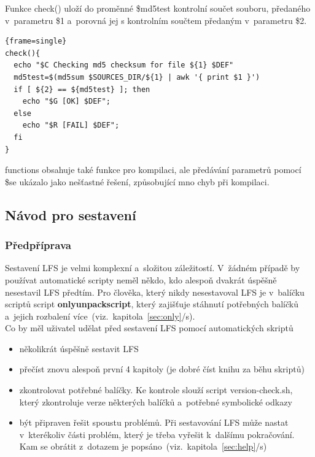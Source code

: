 \documentclass[a4paper,12pt]{article}
\newcommand{\odkazNaKapitolu}[1]{(viz.~kapitola~\ref{#1}/s\pageref{#1})}
\renewcommand{\b}[1]{\textbf{#1}} %
\newenvironment{codeframe}{%
  \begin{Sbox} 
    \begin{minipage} 
      {\columnwidth-\leftmargin-\rightmargin-2\fboxsep-2\fboxrule-4pt} 
}{%

  \end{minipage} 
  \end{Sbox} 
  \begin{center} 
    \fcolorbox{black}{codeback}{\TheSbox} 
  \end{center} 
}
\begin{document}
Funkce check() uloží do proměnné \$md5test kontrolní součet souboru, předaného v~parametru \$1 a~porovná jej s kontrolním součtem předaným v~parametru \$2.
\label{func:md5}
    \begin{codeframe} 
\begin{Verbatim}{frame=single} 
check(){
  echo "$C Checking md5 checksum for file ${1} $DEF"
  md5test=$(md5sum $SOURCES_DIR/${1} | awk '{ print $1 }')
  if [ ${2} == ${md5test} ]; then
    echo "$G [OK] $DEF";
  else
    echo "$R [FAIL] $DEF";
  fi
}
\end{Verbatim} 
    \end{codeframe}

functions obsahuje také funkce pro kompilaci, ale předávání parametrů pomocí \$\@ se ukázalo jako nešťastné řešení, způsobující mno chyb při kompilaci.

\subsection{Návod pro sestavení}
\subsubsection{Předpříprava}
Sestavení LFS je velmi komplexní a~složitou záležitostí. V~žádném případě by používat automatické scripty neměl někdo, kdo alespoň dvakrát úspěšně nesestavil LFS předtím. Pro člověka, který nikdy nesestavoval LFS je v~balíčku scriptů script \b{onlyunpackscript}, který zajišťuje stáhnutí potřebných balíčků a~jejich rozbalení více~\odkazNaKapitolu{sec:only}.\\

Co by měl uživatel udělat před sestavení LFS pomocí automatických skriptů
\begin{itemize}
 \item několikrát úspěšně sestavit LFS
 \item přečíst znovu alespoň první 4 kapitoly (je dobré číst knihu za běhu skriptů)
 \item zkontrolovat potřebné balíčky. Ke kontrole slouží script version-check.sh, který zkontroluje verze některých balíčků a~potřebné symbolické odkazy
 \item být připraven řešit spoustu problémů. Při sestavování LFS může nastat v~kterékoliv části problém, který je třeba vyřešit k~dalšímu pokračování. Kam se obrátit z~dotazem je popsáno~\odkazNaKapitolu{sec:help}
\end{itemize}
\end{document}
